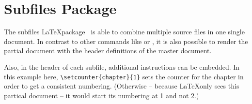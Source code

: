 \documentclass[master.tex]{subfiles}
\begin{document}
\chapter{Subfiles Package}

The subfiles \LaTeX package~\cite{subfiles}
is able to combine multiple source files
in one single document.
In contrast to other commands like \verb|| or \verb||,
it is also possible to render the partial document with
the header definitions of the master document.

Also, in the header of each subfile,
additional instructions can be embedded.
In this example here,
\verb|\setcounter{chapter}{1}| sets the counter for the chapter
in order to get a consistent numbering.
(Otherwise -- because \LaTeX only sees this partical document --
it would start its numbering at 1 and not 2.)
\end{document}
